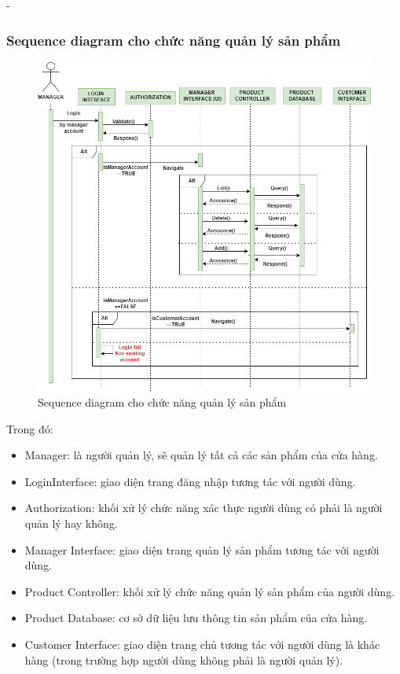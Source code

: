 \begin {list} {-}{}
\subsubsection{Sequence diagram cho chức năng quản lý sản phẩm}
\begin{figure}[H]
    \centering
    \includegraphics[scale=0.5]{images/hieu/chap-3/manage-product-sequence-diagram.png}
    \caption{Sequence diagram cho chức năng quản lý sản phẩm}
\end{figure}
Trong đó:
\begin{itemize}
    \item Manager: là người quản lý, sẽ quản lý tất cả các sản phẩm của cửa hàng.
    \item LoginInterface: giao diện trang đăng nhập tương tác với người dùng.
    \item Authorization: khối xử lý chức năng xác thực người dùng có phải là người quản lý hay không.
    \item Manager Interface: giao diện trang quản lý sản phẩm tương tác với người dùng.
    \item Product Controller: khối xử lý chức năng quản lý sản phẩm của người dùng.
    \item Product Database: cơ sở dữ liệu lưu thông tin sản phẩm của cửa hàng.
    \item Customer Interface: giao diện trang chủ tương tác với người dùng là khác hàng (trong trường hợp người dùng không phải là người quản lý).
\end{itemize}
\newpage

\end{list}
